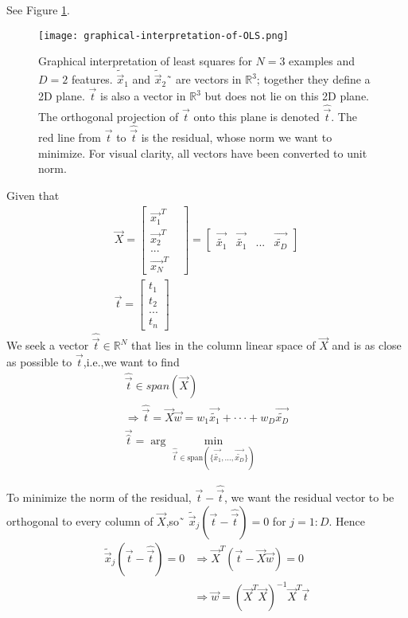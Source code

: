 See Figure \ref{fig:graphical-interpretation-of-OLS}.
\begin{figure}[hbtp]
\centering
    \texttt{[image: graphical-interpretation-of-OLS.png]}
\caption{Graphical interpretation of least squares for $N=3$ examples and $D=2$ features. $\tilde{\vec{x}}_1$ and $\tilde{\vec{x}}_2$˜ are vectors in $\mathbb{R}^3$; together they define a 2D plane. $\vec{t}$ is also a vector in $\mathbb{R}^3$ but does not lie on this 2D plane. The orthogonal projection of $\vec{t}$ onto this plane is denoted $\hat{\vec{t}}$. The red line from $\vec{t}$ to $\hat{\vec{t}}$ is the residual, whose norm we want to minimize. For visual clarity, all vectors have been converted to unit norm.}
\label{fig:graphical-interpretation-of-OLS} 
\end{figure}
Given that
\begin{eqnarray}
\vec{X} = \begin{bmatrix}
\vec{x_1}^T &\\
\vec{x_2}^T &\\
 ...        &\\
\vec{x_N}^T
\end{bmatrix} 
= \begin{bmatrix}
\vec{\tilde{x_1}} & \vec{\tilde{x_1}} & ... &\vec{\tilde{x_D}}
\end{bmatrix}\\
\vec{t} = \begin{bmatrix}
t_1 \\
t_2 \\
... \\
t_n
\end{bmatrix} 
\end{eqnarray}
We seek a vector $\hat{\vec{t}} \in \mathbb{R}^N$ that lies in the column linear space of $\vec{X}$ and is as close as possible to $\vec{t}$,i.e.,we want to find
\begin{eqnarray}
\hat{\vec{t}} \in span(\vec{X}) \\
\Rightarrow \hat{\vec{t}} = \vec{X}\vec{w} = w_1\vec{\tilde{x_1}}+\cdot\cdot\cdot+w_D\vec{\tilde{x_D}} \\
\vec{\hat{t}}=\arg\min\limits_{\hat{\vec{t}} \in \text{span} (\{\vec{\tilde{x_1}},...,\vec{\tilde{x_D}}\})}
\end{eqnarray}

To minimize the norm of the residual, $\vec{t}-\hat{\vec{t}}$, we want the residual vector to be orthogonal to every column of $\vec{X}$,so˜ $\tilde{\vec{x}}_j(\vec{t}-\hat{\vec{t}})=0$ for $j=1:D$. Hence
\begin{equation}\begin{split}
\tilde{\vec{x}}_j(\vec{t}-\hat{\vec{t}})=0 & \Rightarrow \vec{X}^T(\vec{t}-\vec{X}\vec{w})=0 \\
                                           & \Rightarrow \vec{w}=(\vec{X}^T\vec{X})^{-1}\vec{X}^T\vec{t}
\end{split}\end{equation}


